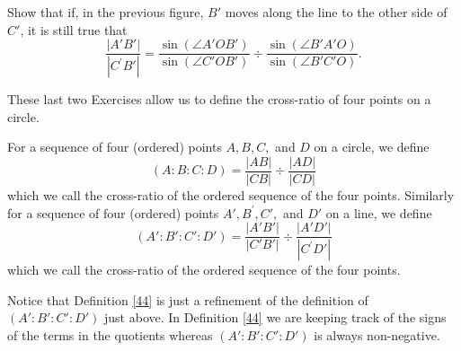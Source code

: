 \begin{exercise}\label{49}
Show that if, in the previous figure, $B'$ moves
along the line to the other side of $C'$, it is still true that%
\[
\frac{\left\vert A'B'\right\vert }{\left\vert C^{\prime
}B'\right\vert }=\frac{\sin\left(  \angle A'%
OB'\right)  }{\sin\left(  \angle C'OB'\right)
}\div\frac{\sin\left(  \angle B'A'O\right)
}{\sin\left(  \angle B'C'O\right)  }.
\]
\begin{solution}
\end{solution}
\end{exercise}

These last two Exercises allow us to define the cross-ratio of four
points on a circle.

\begin{definition}
For a sequence of four (ordered) points $A,B,C,$ and $D$ on a circle,
we define%
\[
\left(  A:B:C:D\right)  =\frac{\left\vert AB\right\vert }{\left\vert
CB\right\vert }\div\frac{\left\vert AD\right\vert }{\left\vert CD\right\vert }%
\]
which we call the cross-ratio of the ordered sequence of the four points.
Similarly for a sequence of four (ordered) points $A',B^{\prime
},C',$ and $D'$ on a line, we define%
\[
\left(  A':B':C':D'\right)  =\frac{\left\vert
A'B'\right\vert }{\left\vert C'B'\right\vert
}\div\frac{\left\vert A'D'\right\vert }{\left\vert C^{\prime
}D'\right\vert }%
\]
which we call the cross-ratio of the ordered sequence of the four points.
\end{definition}

Notice that Definition \ref{44} is just a refinement of the definition
of $\left( A':B':C':D'\right) $ just above. In Definition \ref{44} we
are keeping track of the signs of the terms in the quotients whereas
$\left( A':B':C':D'\right)$ is always non-negative.

